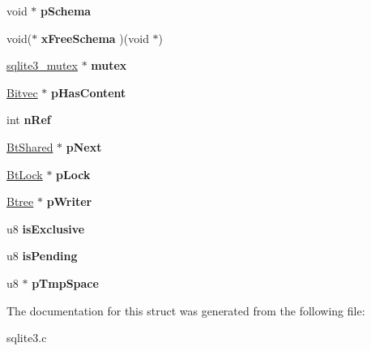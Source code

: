 \begin{DoxyCompactItemize}
\item 
\hypertarget{struct_bt_shared_aea3ccb6775c768fbd4f3e29df8cb925d}{void $\ast$ {\bfseries p\-Schema}}\label{struct_bt_shared_aea3ccb6775c768fbd4f3e29df8cb925d}

\item 
\hypertarget{struct_bt_shared_a7c4816c63acea30ed44ffc58b468463e}{void($\ast$ {\bfseries x\-Free\-Schema} )(void $\ast$)}\label{struct_bt_shared_a7c4816c63acea30ed44ffc58b468463e}

\item 
\hypertarget{struct_bt_shared_a454c31d726220bbed43c165e370460c8}{\hyperlink{structsqlite3__mutex}{sqlite3\-\_\-mutex} $\ast$ {\bfseries mutex}}\label{struct_bt_shared_a454c31d726220bbed43c165e370460c8}

\item 
\hypertarget{struct_bt_shared_ace6191dc3f48f9575d7946ab8cf5b919}{\hyperlink{struct_bitvec}{Bitvec} $\ast$ {\bfseries p\-Has\-Content}}\label{struct_bt_shared_ace6191dc3f48f9575d7946ab8cf5b919}

\item 
\hypertarget{struct_bt_shared_a43d0226fa08d7fae5f992f3a2d72cc08}{int {\bfseries n\-Ref}}\label{struct_bt_shared_a43d0226fa08d7fae5f992f3a2d72cc08}

\item 
\hypertarget{struct_bt_shared_aaa9dd5c5d4ec2bb79ebe4b37ee926ae3}{\hyperlink{struct_bt_shared}{Bt\-Shared} $\ast$ {\bfseries p\-Next}}\label{struct_bt_shared_aaa9dd5c5d4ec2bb79ebe4b37ee926ae3}

\item 
\hypertarget{struct_bt_shared_af58c79eec88f99ed5a07d8cabf8a1d1a}{\hyperlink{struct_bt_lock}{Bt\-Lock} $\ast$ {\bfseries p\-Lock}}\label{struct_bt_shared_af58c79eec88f99ed5a07d8cabf8a1d1a}

\item 
\hypertarget{struct_bt_shared_ad8b2679e54027d58a3be3afcca4df1d6}{\hyperlink{struct_btree}{Btree} $\ast$ {\bfseries p\-Writer}}\label{struct_bt_shared_ad8b2679e54027d58a3be3afcca4df1d6}

\item 
\hypertarget{struct_bt_shared_a416a0c0b3e26ed2ffff7e5e0cad53dc2}{u8 {\bfseries is\-Exclusive}}\label{struct_bt_shared_a416a0c0b3e26ed2ffff7e5e0cad53dc2}

\item 
\hypertarget{struct_bt_shared_accae7a07dc99dc2de544d437ab265191}{u8 {\bfseries is\-Pending}}\label{struct_bt_shared_accae7a07dc99dc2de544d437ab265191}

\item 
\hypertarget{struct_bt_shared_a89102c20327da8a304f7e95af557bdf4}{u8 $\ast$ {\bfseries p\-Tmp\-Space}}\label{struct_bt_shared_a89102c20327da8a304f7e95af557bdf4}

\end{DoxyCompactItemize}


The documentation for this struct was generated from the following file\-:\begin{DoxyCompactItemize}
\item 
sqlite3.\-c\end{DoxyCompactItemize}
